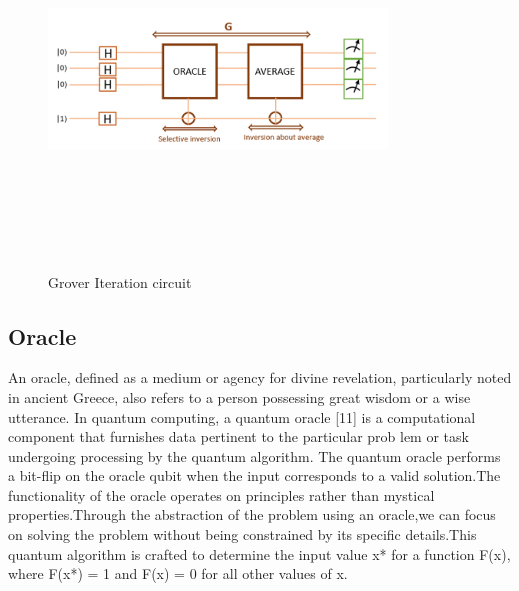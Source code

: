 \documentclass[conference]{IEEEtran}
\begin{document}
\begin{figure}[htbp]
	\centerline{\includegraphics[width=9cm,height=10cm,keepaspectratio]{fig4.png}}
	\caption{Grover Iteration circuit}
	\label{fig}
\end{figure}

\subsection{Oracle}
An oracle, defined as a medium or agency for divine
revelation, particularly noted in ancient Greece, also refers
to a person possessing great wisdom or a wise utterance. In
quantum computing, a quantum oracle [11] is a computational
component that furnishes data pertinent to the particular prob
lem or task undergoing processing by the quantum algorithm.
The quantum oracle performs a bit-flip on the oracle qubit when the input corresponds to a valid solution.The functionality of the oracle operates on principles rather than mystical
properties.Through the abstraction of the problem using an
oracle,we can focus on solving the problem without being
constrained by its specific details.This quantum algorithm is
crafted to determine the input value x* for a function F(x),
where F(x*) = 1 and F(x) = 0 for all other values of x.
\end{document}
